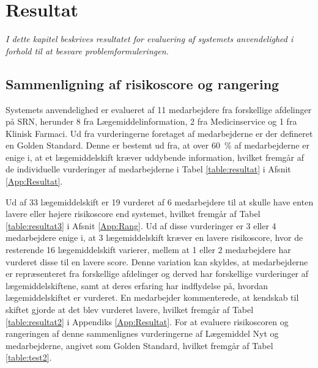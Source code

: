 \chapter{Resultat}
\vspace{-0.3cm}
\textit{I dette kapitel beskrives resultatet for evaluering af systemets anvendelighed i forhold til at besvare problemformuleringen.}

\section{Sammenligning af risikoscore og rangering}
Systemets anvendelighed er evalueret af 11 medarbejdere fra forskellige afdelinger på SRN, herunder 8 fra Lægemiddelinformation, 2 fra Medicinservice og 1 fra Klinisk Farmaci. Ud fra vurderingerne foretaget af medarbejderne er der defineret en Golden Standard. Denne er bestemt ud fra, at over 60~\% af medarbejderne er enige i, at et lægemiddelskift kræver uddybende information, hvilket fremgår af de individuelle vurderinger af medarbejderne i Tabel \ref{table:resultat} i Afsnit \ref{App:Resultat}.

Ud af 33 lægemiddelskift er 19 vurderet af 6 medarbejdere til at skulle have enten lavere eller højere risikoscore end systemet, hvilket fremgår af Tabel \ref{table:resultat3} i Afsnit \ref{App:Rang}. Ud af disse vurderinger er 3 eller 4 medarbejdere enige i, at 3 lægemiddelskift kræver en lavere risikoscore, hvor de resterende 16 lægemiddelskift varierer, mellem at 1 eller 2 medarbejdere har vurderet disse til en lavere score. Denne variation kan skyldes, at medarbejderne er repræsenteret fra forskellige afdelinger og derved har forskellige vurderinger af lægemiddelskiftene, samt at deres erfaring har indflydelse på, hvordan lægemiddelskiftet er vurderet. En medarbejder kommenterede, at kendskab til skiftet gjorde at det blev vurderet lavere, hvilket fremgår af Tabel \ref{table:resultat2} i Appendiks \ref{App:Resultat}. %
For at evaluere risikoscoren og rangeringen af denne sammenlignes vurderingerne af Lægemiddel Nyt og medarbejderne, angivet som Golden Standard, hvilket fremgår af Tabel \ref{table:test2}. 

